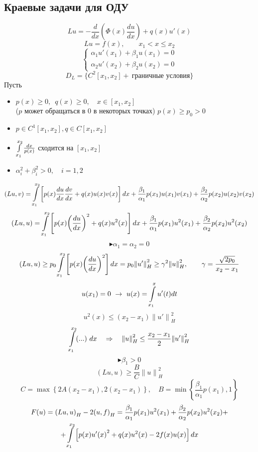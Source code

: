 \subsection{Краевые задачи для ОДУ}

\[ Lu = - \frac{d}{dx} \left( \Phi(x) \frac{du}{dx} \right) + q(x)u'(x) \]
\[ Lu = f(x), \qquad x_1 < x \leq x_2 \]
\[ \left\{ \begin{array}{l}
	\alpha_1 u'(x_1) + \beta_1 u(x_1) = 0 \\
	\alpha_2 u'(x_2) + \beta_2 u(x_2) = 0
\end{array} \right. \]
\[ D_L = \{ C^2[x_1, x_2] + \ \text{граничные условия} \} \]
Пусть
\begin{itemize}
	\item $ p(x) \geq 0, \enspace q(x) \geq 0, \quad x \in [x_1, x_2] $ \\ ($p$ может обращаться в 0 в некоторых точках) $ p(x) \geq p_0 > 0 $
	\item $ p \in C^1[x_1, x_2], q \in C[x_1, x_2] $
	\item $ \int\limits_{x_1}^{x_2} \frac{dx}{p(x)} $ сходится на $ [x_1, x_2] $
	\item $ \alpha_i^2 + \beta_i^2 > 0, \quad i = 1, 2 $
\end{itemize}
\[ (Lu, v) = \int\limits_{x_1}^{x_2} \left[ p(x) \frac{du}{dx} \frac{dv}{dx} + q(x) u(x) v(x) \right] dx + \frac{\beta_1}{\alpha_1} p(x_1) u(x_1) v(x_1) + \frac{\beta_2}{\alpha_2} p(x_2) u(x_2) v(x_2) \]
\[ (Lu, u) = \int\limits_{x_1}^{x_2} \left[ p(x) {\left(\frac{du}{dx}\right)}^2 + q(x) u^2(x) \right] dx + \frac{\beta_1}{\alpha_1} p(x_1) u^2(x_1) + \frac{\beta_2}{\alpha_2} p(x_2) u^2(x_2)  \]
\[  \blacktriangleright \alpha_1 = \alpha_2 = 0 \]
\[ (Lu, u) \geq p_0 \int\limits_{x_1}^{x_2} \left[ p(x) {\left(\frac{du}{dx}\right)}^2 \right] dx = p_0 {\| u' \|}^2_H \geq \gamma^2 {\| u \|}^2_H, \qquad \gamma = \frac{\sqrt{2p_0}}{x_2 - x_1} \]
\[ u(x_1)=0 \ \rightarrow \ u(x) = \int\limits_{x_1}^{x} u'(t) dt \]
\[ u^2(x) \leq (x_2 - x_1) {\| u' \|}^2_H \]
\[ \int\limits_{x_1}^{x_2} (...) \ dx \quad \Rightarrow \quad {\| u \|}^2_H \leq \frac{x_2 - x_1}{2} {\| u' \|}^2_H \]
\[ \blacktriangleright \beta_1 > 0 \]
\[ (Lu, u) \geq \frac{B}{C} {\| u \|}^2_H \]
\[ C = \max\left\{2A(x_2 -x_1), 2(x_2 - x_1)\right\}, \quad B = \min\left\{\frac{\beta_1}{\alpha_1} p(x_1), 1\right\} \]
\begin{multline*}
	F(u) = {(Lu, u)}_H - 2{(u,f)}_H = \frac{\beta_1}{\alpha_1} p(x_1) u^2(x_1) + \frac{\beta_2}{\alpha_2} p(x_2) u^2(x_2) + \\ + \int\limits_{x_1}^{x_2} \left[ p(x) {u'(x)}^2 + q(x) u^2(x) - 2f(x)u(x) \right] dx
\end{multline*}
